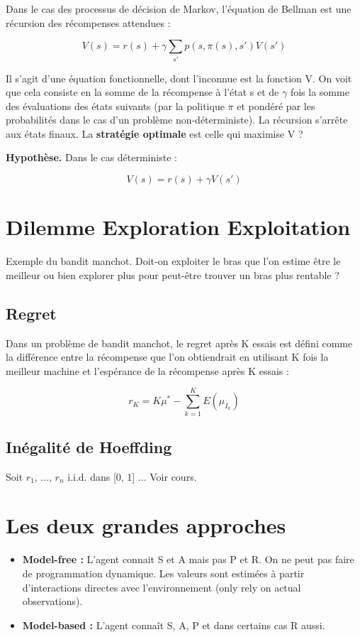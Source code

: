 \documentclass{article}
\begin{document}
Dans le cas des processus de décision de Markov, l'équation de Bellman est une récursion des récompenses attendues :

\[ V(s) = r(s) + \gamma \sum_{s'} p(s, \pi(s), s') V(s') \]

Il s'agit d'une équation fonctionnelle, dont l'inconnue est la fonction V. On voit que cela consiste en la somme de la récompense à l'état s et de $\gamma$ fois la somme des évaluations des états suivants (par la politique $\pi$ et pondéré par les probabilités dans le cas d'un problème non-déterministe). La récursion s'arrête aux états finaux. La \textbf{stratégie optimale} est celle qui maximise V ?

\textbf{Hypothèse.} Dans le cas déterministe : 

\[ V(s) = r(s) + \gamma V(s') \]

\section{Dilemme Exploration Exploitation}

Exemple du bandit manchot. Doit-on exploiter le bras que l'on estime être le meilleur ou bien explorer plus pour peut-être trouver un bras plus rentable ?

\subsection*{Regret}

Dans un problème de bandit manchot, le regret après K essais est défini comme la différence entre la récompense que l'on obtiendrait en utilisant K fois la meilleur machine et l'espérance de la récompense après K essais :

\[ r_K = K\mu^* - \sum_{k=1}^K E(\mu_{I_k}) \]

\subsection*{Inégalité de Hoeffding}

Soit $r_1$, ..., $r_n$ i.i.d. dans [0, 1] ... Voir cours.

\section{Les deux grandes approches}

\begin{itemize}
    \item \textbf{Model-free :} L'agent connait S et A mais pas P et R. On ne peut pas faire de programmation dynamique. Les valeurs sont estimées à partir d'interactions directes avec l'environnement (only rely on actual observations).
    \item \textbf{Model-based :} L'agent connaît S, A, P et dans certains cas R aussi.
\end{itemize}
\end{document}
